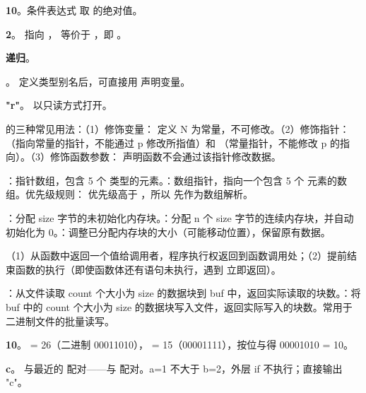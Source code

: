 \documentclass[a4paper,11pt]{article}
\begin{document}
\examtitle



\q \textbf{10}。条件表达式  取  的绝对值。

\q \textbf{2}。 指向 ， 等价于 ，即 。

\q \textbf{递归}。

\q {}。 定义类型别名后，可直接用  声明变量。

\q \textbf{"r"}。 以只读方式打开。


\q {} 的三种常见用法：（1）修饰变量： 定义 N 为常量，不可修改。（2）修饰指针：（指向常量的指针，不能通过 p 修改所指值）和 （常量指针，不能修改 p 的指向）。（3）修饰函数参数： 声明函数不会通过该指针修改数据。

\q {}：指针数组，包含 5 个  类型的元素。：数组指针，指向一个包含 5 个  元素的数组。优先级规则：\code{[]} 优先级高于 \code{*}，所以  先作为数组解析。

\q {}：分配 size 字节的未初始化内存块。：分配 n 个 size 字节的连续内存块，并自动初始化为 0。：调整已分配内存块的大小（可能移动位置），保留原有数据。

\q （1）从函数中返回一个值给调用者，程序执行权返回到函数调用处；（2）提前结束函数的执行（即使函数体还有语句未执行，遇到  立即返回）。

\q {}：从文件读取 count 个大小为 size 的数据块到 buf 中，返回实际读取的块数。：将 buf 中的 count 个大小为 size 的数据块写入文件，返回实际写入的块数。常用于二进制文件的批量读写。


\q \textbf{10}。 = 26（二进制 00011010）， = 15（00001111），按位与得 00001010 = 10。

\q \textbf{c}。 与最近的  配对——与  配对。a=1 不大于 b=2，外层 if 不执行；直接输出 "c"。
\end{document}
